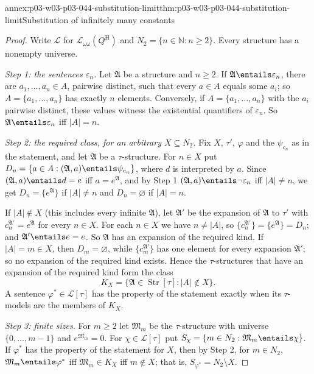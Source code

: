 \begin{annexitem}{annex:p03-w03-p03-044-substitution-limit}{thm:p03-w03-p03-044-substitution-limit}{Substitution of infinitely many constants}
\begin{proof}
Write \(\mathscr L\) for \(\mathscr L_{\omega\omega}(Q^{\mathrm H})\) and
\(N_2=\{n\in\mathbb N:n\ge2\}\).  Every structure has a nonempty universe.

\emph{Step 1: the sentences \(\varepsilon_n\).}  Let \(\mathfrak A\) be a
structure and \(n\ge2\).  If \(\mathfrak A\entails\varepsilon_n\), there are
\(a_1,\ldots,a_n\in A\), pairwise distinct, such that every \(a\in A\)
equals some \(a_i\); so \(A=\{a_1,\ldots,a_n\}\) has exactly \(n\) elements.
Conversely, if \(A=\{a_1,\ldots,a_n\}\) with the \(a_i\) pairwise distinct,
these values witness the existential quantifiers of \(\varepsilon_n\).  So
\(\mathfrak A\entails\varepsilon_n\) iff \(|A|=n\).

\emph{Step 2: the required class, for an arbitrary
\(X\subseteq N_2\).}  Fix \(X\), \(\tau'\), \(\varphi\) and the
\(\psi_{c_n}\) as in the statement, and let \(\mathfrak A\) be a
\(\tau\)-structure.  For \(n\in X\) put
\(D_n=\{a\in A:(\mathfrak A,a)\entails\psi_{c_n}\}\), where \(d\) is
interpreted by \(a\).  Since \((\mathfrak A,a)\entails d=e\) iff
\(a=e^{\mathfrak A}\), and by Step 1 \((\mathfrak A,a)\entails\neg
\varepsilon_n\) iff \(|A|\neq n\), we get \(D_n=\{e^{\mathfrak A}\}\) if
\(|A|\neq n\) and \(D_n=\varnothing\) if \(|A|=n\).

If \(|A|\notin X\) (this includes every infinite \(\mathfrak A\)), let
\(\mathfrak A'\) be the expansion of \(\mathfrak A\) to \(\tau'\) with
\(c_n^{\mathfrak A'}=e^{\mathfrak A}\) for every \(n\in X\).  For each
\(n\in X\) we have \(n\neq|A|\), so \(\{c_n^{\mathfrak A'}\}=
\{e^{\mathfrak A}\}=D_n\); and \(\mathfrak A'\entails e=e\).  So
\(\mathfrak A\) has an expansion of the required kind.  If \(|A|=m\in X\),
then \(D_m=\varnothing\), while \(\{c_m^{\mathfrak A'}\}\) has one element
for every expansion \(\mathfrak A'\); so no expansion of the required kind
exists.  Hence the \(\tau\)-structures that have an expansion of the
required kind form the class
\[
 K_X=\{\mathfrak A\in\operatorname{Str}[\tau]:|A|\notin X\}.
\]
A sentence \(\varphi^\ast\in\mathscr L[\tau]\) has the property of the
statement exactly when its \(\tau\)-models are the members of \(K_X\).

\emph{Step 3: finite sizes.}  For \(m\ge2\) let \(\mathfrak M_m\) be the
\(\tau\)-structure with universe \(\{0,\ldots,m-1\}\) and
\(e^{\mathfrak M_m}=0\).  For \(\chi\in\mathscr L[\tau]\) put
\(S_\chi=\{m\in N_2:\mathfrak M_m\entails\chi\}\).  If \(\varphi^\ast\) has
the property of the statement for \(X\), then by Step 2, for \(m\in N_2\),
\(\mathfrak M_m\entails\varphi^\ast\) iff \(\mathfrak M_m\in K_X\) iff
\(m\notin X\); that is, \(S_{\varphi^\ast}=N_2\setminus X\).


\end{proof}
\end{annexitem}
